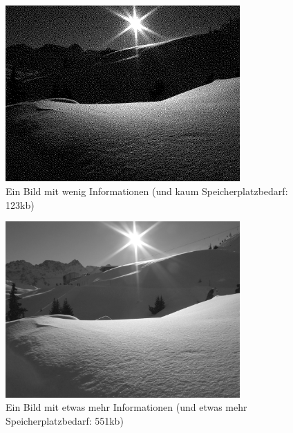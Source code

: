 \begin{frame}{}
  \begin{figure}
    \begin{center}  
      \includegraphics[width=0.8\textwidth]{pics/sw}
    \end{center}
    \caption{Ein Bild mit wenig Informationen (und kaum Speicherplatzbedarf: 123kb)}
  \end{figure}
\end{frame}
%
\begin{frame}{}
  \begin{figure}
    \begin{center}  
      \includegraphics[width=0.8\textwidth]{pics/grau}
    \end{center}
    \caption{Ein Bild mit etwas mehr Informationen (und etwas mehr Speicherplatzbedarf:
551kb)}
  \end{figure}
\end{frame}
%
